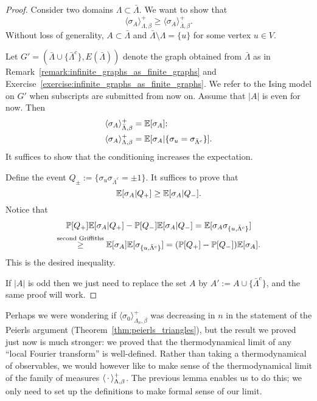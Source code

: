 \begin{proof}
    Consider two domains $\Lambda\subset\bar\Lambda$.
    We want to show that
    \[
        \langle\sigma_A\rangle_{\Lambda,\beta}^+
        \geq
        \langle\sigma_A\rangle_{\bar\Lambda,\beta}^+.
    \]
    Without loss of generality,
    $A\subset\bar\Lambda$ and
    $\bar\Lambda\setminus\Lambda=\{u\}$ for some
    vertex $u\in V$.

    Let $G'=(\bar\Lambda\cup\{\bar\Lambda^c\},E(\bar\Lambda))$ denote the graph obtained from $\bar\Lambda$
    as in Remark~\ref{remark:infinite_graphs_as_finite_graphs}
    and Exercise~\ref{exercise:infinite_graphs_as_finite_graphs}.
    We refer to the Ising model on $G'$ when subscripts are submitted from now on.
    Assume that $|A|$ is even for now.
    Then
    \begin{align}
        &\langle\sigma_A\rangle_{\bar\Lambda,\beta}^+
        =
        \mathbb E[\sigma_A];
        \\
        &\langle\sigma_A\rangle_{\Lambda,\beta}^+
        =
        \mathbb E[\sigma_A|\{\sigma_u=\sigma_{\bar\Lambda^c}\}].
    \end{align}
    It suffices to show that the conditioning increases the expectation.
    
    Define the event $Q_\pm:=\{\sigma_u\sigma_{\bar\Lambda^c}=\pm 1\}$.
    It suffices to prove that
    \[
        \mathbb E[\sigma_A|Q_+]
        \geq
        \mathbb E[\sigma_A|Q_-].
    \]
    Notice that
    \begin{multline}
        \P[Q_+]\E[\sigma_A|Q_+]
        -
        \P[Q_-]\E[\sigma_A|Q_-]
        =
        \E[\sigma_A\sigma_{\{u,\bar\Lambda^c\}}]
        \\
        \stackrel{\text{second Griffiths}}\geq
        \E[\sigma_A]\E[\sigma_{\{u,\bar\Lambda^c\}}]
        =(\P[Q_+]
        -
        \P[Q_-])\E[\sigma_A].
    \end{multline}
    This is the desired inequality.

    If $|A|$ is odd then we just need to replace the set $A$
    by $A':=A\cup\{\bar\Lambda^c\}$,
    and the same proof will work.
\end{proof}

Perhaps we were wondering if $\langle\sigma_0\rangle_{\Lambda_n,\beta}^+$
was decreasing in $n$ in the statement of the Peierls argument
(Theorem~\ref{thm:peierls_triangles}),
but the result we proved just now is much stronger:
we proved that the thermodynamical limit of any ``local Fourier transform''
is well-defined.
Rather than taking a thermodynamical of observables,
we would however like to make sense of the thermodynamical limit
of the family of measures $\langle\,\cdot\,\rangle_{\Lambda,\beta}^+$.
The previous lemma enables us to do this;
we only need to set up the definitions to make formal sense of our limit.

